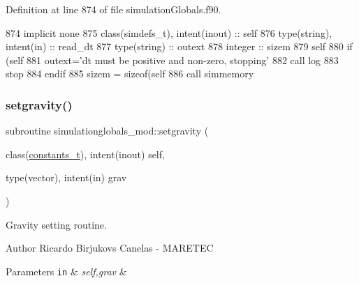 Definition at line 874 of file simulation\+Globals.\+f90.


\begin{DoxyCode}
874     \textcolor{keywordtype}{implicit none}
875     \textcolor{keywordtype}{class}(simdefs\_t), \textcolor{keywordtype}{intent(inout)} :: self
876     \textcolor{keywordtype}{type}(string), \textcolor{keywordtype}{intent(in)} :: read\_dt
877     \textcolor{keywordtype}{type}(string) :: outext
878     \textcolor{keywordtype}{integer} :: sizem
879     self%
880     \textcolor{keywordflow}{if} (self%
881         outext=\textcolor{stringliteral}{'dt must be positive and non-zero, stopping'}
882         \textcolor{keyword}{call }log%
883         stop
884 \textcolor{keywordflow}{    endif}
885     sizem = sizeof(self%
886     \textcolor{keyword}{call }simmemory%
\end{DoxyCode}
\mbox{\label{namespacesimulationglobals__mod_ae6b88d15ddc389aedd73d600de0337df}} 
\subsubsection{\texorpdfstring{setgravity()}{setgravity()}}
{\footnotesize\ttfamily subroutine simulationglobals\+\_\+mod\+::setgravity (\begin{DoxyParamCaption}\item[{class(\mbox{\hyperlink{structsimulationglobals__mod_1_1constants__t}{constants\+\_\+t}}), intent(inout)}]{self,  }\item[{type(vector), intent(in)}]{grav }\end{DoxyParamCaption})\hspace{0.3cm}{\ttfamily [private]}}



Gravity setting routine. 

\begin{DoxyAuthor}{Author}
Ricardo Birjukovs Canelas -\/ M\+A\+R\+E\+T\+EC 
\end{DoxyAuthor}

\begin{DoxyParams}[1]{Parameters}
\mbox{\tt in}  & {\em self,grav} & \\
\hline
\end{DoxyParams}


